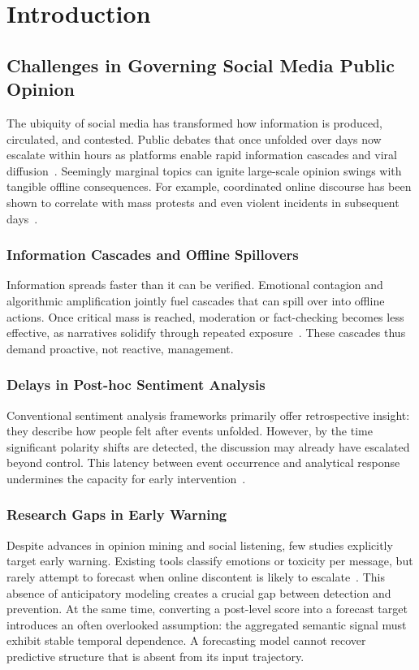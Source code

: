 \documentclass[journal]{IEEEtran}
\begin{document}
\section{Introduction}

\subsection{Challenges in Governing Social Media Public Opinion}
The ubiquity of social media has transformed how information is produced, circulated, and contested. Public debates that once unfolded over days now escalate within hours as platforms enable rapid information cascades and viral diffusion~\cite{Vosoughi2018}. Seemingly marginal topics can ignite large-scale opinion swings with tangible offline consequences. For example, coordinated online discourse has been shown to correlate with mass protests and even violent incidents in subsequent days~\cite{Steinert2015,Arcila2024}.

\subsubsection{Information Cascades and Offline Spillovers}
Information spreads faster than it can be verified. Emotional contagion and algorithmic amplification jointly fuel cascades that can spill over into offline actions. Once critical mass is reached, moderation or fact-checking becomes less effective, as narratives solidify through repeated exposure~\cite{Vosoughi2018}. These cascades thus demand proactive, not reactive, management.

\subsubsection{Delays in Post-hoc Sentiment Analysis}
Conventional sentiment analysis frameworks primarily offer retrospective insight: they describe how people felt after events unfolded. However, by the time significant polarity shifts are detected, the discussion may already have escalated beyond control. This latency between event occurrence and analytical response undermines the capacity for early intervention~\cite{Wang2020}.

\subsubsection{Research Gaps in Early Warning}
Despite advances in opinion mining and social listening, few studies explicitly target early warning. Existing tools classify emotions or toxicity per message, but rarely attempt to forecast when online discontent is likely to escalate~\cite{Wang2020}. This absence of anticipatory modeling creates a crucial gap between detection and prevention. At the same time, converting a post-level score into a forecast target introduces an often overlooked assumption: the aggregated semantic signal must exhibit stable temporal dependence. A forecasting model cannot recover predictive structure that is absent from its input trajectory.
\end{document}

